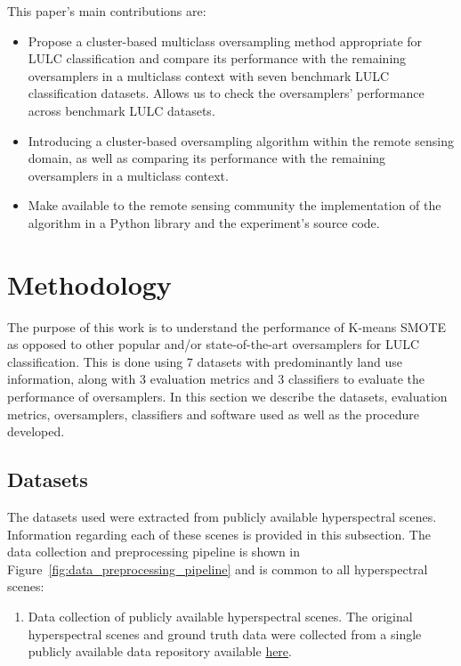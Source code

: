 \documentclass[authoryear,preprint,12pt]{elsarticle}
\begin{document}
\begin{linenumbers}
This paper's main contributions are:
\begin{itemize}
    \item Propose a cluster-based multiclass oversampling method appropriate
        for LULC classification and compare its performance with the remaining
        oversamplers in a multiclass context with seven benchmark LULC
        classification datasets. Allows us to check the oversamplers'
        performance across benchmark LULC datasets.
    \item Introducing a cluster-based oversampling algorithm within the remote
        sensing domain, as well as comparing its performance with the remaining
        oversamplers in a multiclass context.
    \item Make available to the remote sensing community the implementation
        of the algorithm in a Python library and the experiment's source code.
\end{itemize}

\section{Methodology}\label{sec:methodology}

The purpose of this work is to understand the performance of K-means SMOTE as
opposed to other popular and/or state-of-the-art oversamplers for LULC
classification. This is done using 7 datasets with predominantly land use
information, along with 3 evaluation metrics and 3 classifiers to evaluate the
performance of oversamplers. In this section we describe the datasets,
evaluation metrics, oversamplers, classifiers and software used as well as the
procedure developed.

\subsection{Datasets}

The datasets used were extracted from publicly available hyperspectral scenes.
Information regarding each of these scenes is provided in this subsection.
The data collection and preprocessing pipeline is shown in
Figure~\ref{fig:data_preprocessing_pipeline} and is common to all
hyperspectral scenes:

\begin{enumerate}
    
    \item Data collection of publicly available hyperspectral scenes.
        The original hyperspectral scenes and ground truth data were collected
        from a single publicly available data repository available
        \href{http://www.ehu.eus/ccwintco/index.php?title=Hyperspectral_Remote_Sensing_Scenes}{here}.


\end{enumerate}
\end{linenumbers}
\end{document}
